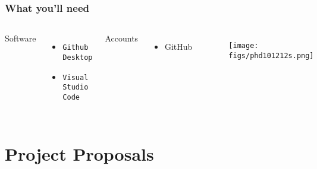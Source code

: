 \documentclass{beamer}
\begin{document}
\begin{frame}
    \frametitle{What you'll need}

\begin{columns}


Software
    \begin{itemize}
        \item \texttt{Github Desktop}
        \item \texttt{Visual Studio Code}
    \end{itemize}
Accounts
    \begin{itemize}
        \item GitHub\footnotemark
    \end{itemize}


   \begin{figure}
    \centering
    \texttt{[image: figs/phd101212s.png]}
  \end{figure}
\end{columns}
\end{frame}


\section{Project Proposals}

\end{document}
